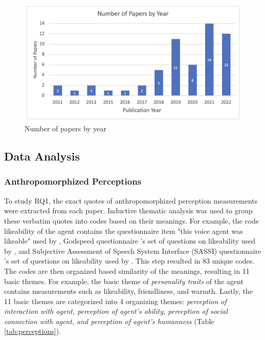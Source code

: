 \documentclass[sigconf,screen,review, anonymous]{acmart}
\newcommand{\cmt}[1]{}%
\begin{document}
\begin{figure}[h]
  \centering
  \includegraphics[width=\columnwidth]{fig-paper.png}
  \caption{Number of papers by year}
  \label{fig:paper}
\end{figure}

\subsection{Data Analysis}

\subsubsection*{Anthropomorphized Perceptions} To study RQ1, the exact quotes of anthropomorphized perception measurements were extracted from each paper. Inductive thematic analysis was used to group these verbatim quotes into codes based on their meanings. For example, the code likeability of the agent contains the questionnaire item "this voice agent was likeable" used by \cite{cuadra2021my}\cmt{[67]}, Godspeed questionnaire \cite{bartneck2009measurement}\cmt{godspeed}'s set of questions on likeability used by \cite{linnemann2018can}\cmt{[15]}, and Subjective Assessment of Speech System Interface (SASSI) questionnaire \cite{hone2000towards}\cmt{sassi}'s set of questions on likeability used by  \cite{chan2021kinvoices}\cmt{[74]}\cite{choi2020nobody}\cmt{[54]}. This step resulted in 83 unique codes. The codes are then organized based similarity of the meanings, resulting in 11 basic themes. For example, the basic theme of \textit{personality traits} of the agent contains measurements such as likeability, friendliness, and warmth. Lastly, the 11 basic themes are categorized into 4 organizing themes: \textit{perception of interaction with agent, perception of agent's ability, perception of social connection with agent, and perception of agent's humanness} (Table \ref{tab:perceptions}).
\end{document}
